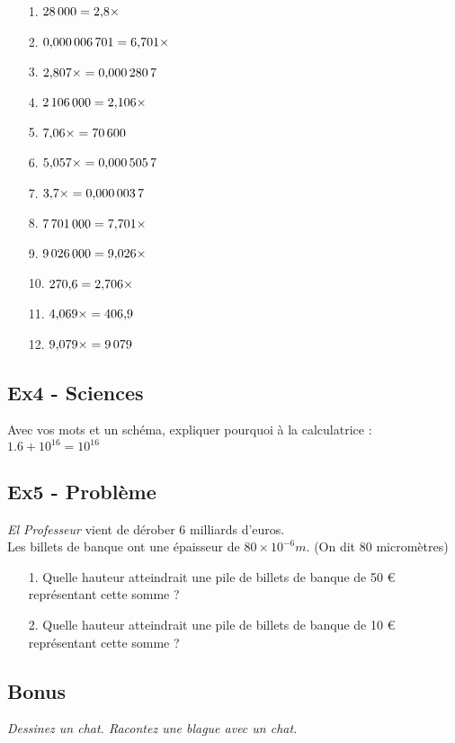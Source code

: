 \documentclass[12pt]{article}
\newcommand{\Pointilles}[1]{%
  \par\nobreak
  \noindent\rule{0pt}{1.5\baselineskip}%
  \multido{}{#1}{\noindent\makebox[\linewidth]{\dotfill}\endgraf}%
  \bigskip%
}
\begin{document}
\begin{multicols}{3}

  \begin{enumerate}
  \item[1.] $28\,000 = 2{,}8 \times \dotfill$
  \item[2.] $0{,}000\,006\,701 = 6{,}701 \times \dotfill$
  \item[3.] $2{,}807 \times \dotfill = 0{,}000\,280\,7$
  \item[4.] $2\,106\,000 = 2{,}106 \times \dotfill$
  \item[5.] $7{,}06 \times \dotfill = 70\,600$
  \item[6.] $5{,}057 \times \dotfill = 0{,}000\,505\,7$
  \item[7.] $3{,}7 \times \dotfill = 0{,}000\,003\,7$
  \item[8.] $7\,701\,000 = 7{,}701 \times \dotfill$
  \item[9.] $9\,026\,000 = 9{,}026 \times \dotfill$
  \item[10.] $270{,}6 = 2{,}706 \times \dotfill$
  \item[11.] $4{,}069 \times \dotfill = 406{,}9$
  \item[12.] $9{,}079 \times \dotfill = 9\,079$
  \end{enumerate}
\end{multicols}


\subsection*{Ex4 - Sciences}

Avec vos mots et un schéma, expliquer pourquoi à la calculatrice : $1.6 + 10^{16} = 10^{16}$ 
\Pointilles{8}

\newpage

\subsection*{Ex5 - Problème}

\textit{\og El Professeur \fg{} } vient de dérober 6 milliards d’euros. \\
Les billets de banque ont une épaisseur de $80 \times 10^{-6} m$. (On dit 80 micromètres)

\begin{itemize}
\item[1.] Quelle hauteur atteindrait une pile de billets de banque de 50 \euro{} représentant cette somme ?
\item[2.] Quelle hauteur atteindrait une pile de billets de banque de 10 \euro{} représentant cette somme ?
\end{itemize}

\Pointilles{20}

\subsection*{Bonus}

\textit{Dessinez un chat. Racontez une blague avec un chat.}
\end{document}
